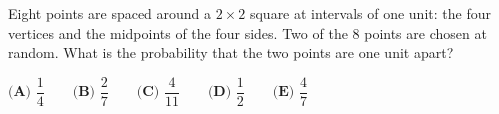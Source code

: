 Eight points are spaced around a $2\times2$ square at intervals of one unit: the four vertices and the midpoints of the four sides. Two of the $8$ points are chosen at random. What is the probability that the two points are one unit apart?

$\textbf{(A) }\dfrac{1}{4}\qquad\textbf{(B) }\dfrac{2}{7}\qquad\textbf{(C) }\dfrac{4}{11}\qquad\textbf{(D) }\dfrac{1}{2}\qquad\textbf{(E) }\dfrac{4}{7}$

